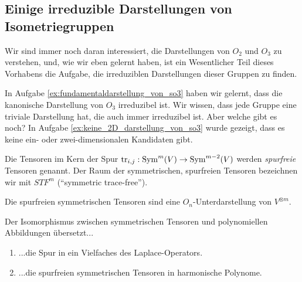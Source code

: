 \subsection{Einige irreduzible Darstellungen von Isometriegruppen}

\begin{remark}
Wir sind immer noch daran interessiert, die Darstellungen von $O_2$ und $O_3$ zu verstehen, und, wie wir eben gelernt haben, ist ein Wesentlicher Teil dieses Vorhabens die Aufgabe, die irreduziblen Darstellungen dieser Gruppen zu finden.

In Aufgabe \ref{ex:fundamentaldarstellung_von_so3} haben wir gelernt, dass die kanonische Darstellung von $O_3$ irreduzibel ist. Wir wissen, dass jede Gruppe eine triviale Darstellung hat, die auch immer irreduzibel ist. Aber welche gibt es noch? In Aufgabe \ref{ex:keine_2D_darstellung_von_so3} wurde gezeigt, dass es keine ein- oder zwei-dimensionalen Kandidaten gibt.
\end{remark}

\begin{definition}
Die Tensoren im Kern der Spur $\operatorname{tr}_{i,j} : \operatorname{Sym}^m(V) \to \operatorname{Sym}^{m-2}(V)$ werden \emph{spurfreie} Tensoren genannt. Der Raum der symmetrischen, spurfreien Tensoren bezeichnen wir mit $STF^m$ (\enquote{symmetric trace-free}).
\end{definition}

\begin{lemma}
Die spurfreien symmetrischen Tensoren sind eine $O_n$-Unterdarstellung von $V^{\otimes m}$.
\end{lemma}

\begin{lemma}
Der Isomorphismus zwischen symmetrischen Tensoren und polynomiellen Abbildungen übersetzt...
\begin{enumerate}
\item ...die Spur in ein Vielfaches des Laplace-Operators.
\item ...die spurfreien symmetrischen Tensoren in harmonische Polynome.
\end{enumerate}
\end{lemma}


